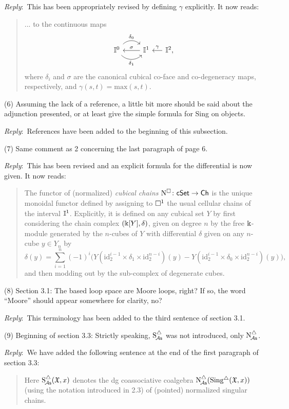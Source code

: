 \documentclass{amsart}
\newcommand{\ar}{\medskip\noindent\textit{Reply}:\ }
\newcommand{\rp}{\medskip\noindent}
\begin{document}
	\ar This has been appropriately revised by defining $\gamma$ explicitly. It now reads: 
    \begin{quote}
     ... to the continuous maps
    \[
    \begin{tikzcd}
    	\gcube^0 \arrow[r, out=45, in=135, "\delta_0"] \arrow[r, out=-45, in=-135, "\delta_1"'] & \gcube^1 \arrow[l, "\sigma"'] &[-10pt] \arrow[l, "\gamma"'] \gcube^2,
    \end{tikzcd}
    \]
    where $\delta_i$ and $\sigma$ are the canonical cubical co-face and co-degeneracy maps, respectively, and $\gamma(s,t)=\text{max}(s,t)$.
    \end{quote}

	\rp (6) Assuming the lack of a reference, a little bit more should be said about the adjunction presented, or at least give the simple formula for Sing on objects.

	\ar References have been added to the beginning of this subsection.

	\rp (7) Same comment as 2 concerning the last paragraph of page 6.

	\ar This has been revised and an explicit formula for the differential is now given. It now reads:

	\begin{quote}
		The functor of (normalized) \textit{cubical chains} $\operatorname{N^{\square}} \colon \mathsf{cSet} \to \mathsf{Ch}$ is the unique monoidal functor defined by assigning to $\square^1$ the usual cellular chains of the interval $\mathbb{I}^1$.
		Explicitly, it is defined on any cubical set $Y$ by first considering the chain complex $(\Bbbk[Y], \delta)$, given on degree $n$ by the free $\Bbbk$-module generated by the $n$-cubes of $Y$ with differential $\delta$ given on any $n$-cube $y \in Y_n$ by
		\[
		\delta(y) = \sum_{i=1}^n (-1)^i
		\big(
		Y(\text{id}_2^{i-1} \times \delta_1 \times \text{id}_2^{n-i})(y) -
		Y(\text{id}_2^{i-1} \times \delta_0 \times \text{id}_2^{n-i})(y)
		\big),
		\]
		and then modding out by the sub-complex of degenerate cubes.
	\end{quote}

	\rp (8) Section 3.1: The based loop space are Moore loops, right?
	If so, the word ``Moore'' should appear somewhere for clarity, no?

	\ar This terminology has been added to the third sentence of section 3.1.

	\rp (9) Beginning of section 3.3: Strictly speaking, $\operatorname{S^{\triangle}_{\!{\mathcal{A}\mathsf{s}}}}$ was not introduced, only $\operatorname{N^{\triangle}_{\!{\mathcal{A}\mathsf{s}}}}$.

	\ar We have added the following sentence at the end of the first paragraph of section 3.3:
    \begin{quote}
         Here $\operatorname{S^{\triangle}_{\!{\mathcal{A}\mathsf{s}}}}(\mathfrak{X},x)$ denotes the dg coassociative coalgebra $\operatorname{N^{\triangle}_{\!{\mathcal{A}\mathsf{s}}}}(\operatorname{Sing^{\triangle}}(\mathfrak{X},x))$ (using the notation introduced in 2.3) of (pointed) normalized singular chains.
    \end{quote}
\end{document}
